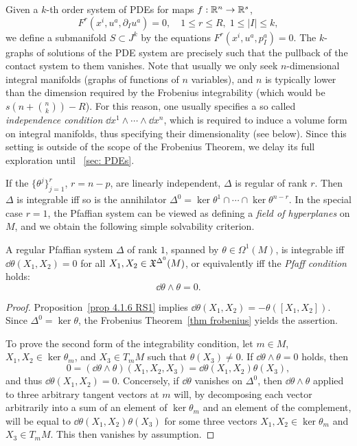 \begin{rem}
    Given a $k$-th order system of PDEs for maps $f:\mathbb{R}^n\to \mathbb{R}^s$, 
    \[F^r(x^i,u^a,\partial_I u^a)=0,\quad 1\leq r\leq R,\; 1\leq |I|\leq k,\]
    we define a submanifold $S\subset J^k$ by the equations $F^r(x^i,u^a,p_I^a)=0$. The $k$-graphs of solutions of the PDE system are precisely such that the pullback of the contact system to them vanishes. Note that usually we only seek $n$-dimensional integral manifolds (graphs of functions of $n$ variables), and $n$ is typically lower than the dimension required by the Frobenius integrability (which would be $s\left(n+\binom{n}{k}\right)-R$). For this reason, one usually specifies a so called \emph{independence condition} $\dd x^1\wedge\cdots\wedge\dd x^n$, which is required to induce a volume form on integral manifolds, thus specifying their dimensionality (see below). Since this setting is outside of the scope of the Frobenius Theorem, we delay its full exploration until \Sect~\ref{sec: PDEs}.
\end{rem}

If the $\{\theta^j\}_{j=1}^r$, $r=n-p$, are linearly independent, $\Delta$ is regular of rank $r$. Then $\Delta$ is integrable iff so is the annihilator $\Delta^0=\ker\theta^1\cap\cdots\cap\ker\theta^{n-r}$. In the special case $r=1$, the Pfaffian system can be viewed as defining a \emph{field of hyperplanes} on $M$, and we obtain the following simple solvability criterion.

\begin{prop}\label{prop 4.7.6 RS1 pfaffian rank 1}
    A regular Pfaffian system $\Delta$ of rank $1$, spanned by $\theta\in\Omega^1(M)$, is integrable iff $\dd\theta(X_1,X_2)=0$ for all $X_1,X_2\in\mathfrak{X}^{\Delta^0}(M)$, or equivalently iff the \emph{Pfaff condition} holds:
    \[\dd\theta\wedge\theta=0.\]
\end{prop}
\begin{proof}
    Proposition~\ref{prop 4.1.6 RS1} implies $\dd\theta(X_1,X_2)=-\theta([X_1,X_2])$. Since $\Delta^0=\ker\theta$, the Frobenius Theorem~\ref{thm frobenius} yields the assertion. 

    To prove the second form of the integrability condition, let $m\in M$, $X_1,X_2\in\ker\theta_m$, and $X_3\in T_mM$ such that $\theta(X_3)\neq 0$. If $\dd\theta\wedge\theta=0$ holds, then 
    \[0=(\dd\theta\wedge\theta)(X_1,X_2,X_3)=\dd\theta(X_1,X_2)\theta(X_3),\]
    and thus $\dd \theta(X_1,X_2)=0$. Concersely, if $\dd\theta$ vanishes on $\Delta^0$, then $\dd \theta\wedge\theta$ applied to three arbitrary tangent vectors at $m$ will, by decomposing each vector arbitrarily into a sum of an element of $\ker\theta_m$ and an element of the complement, will be equal to $\dd \theta(X_1,X_2)\theta(X_3)$ for some three vectors $X_1,X_2\in \ker\theta_m$ and $X_3\in T_m M$. This then vanishes by assumption.
\end{proof}

